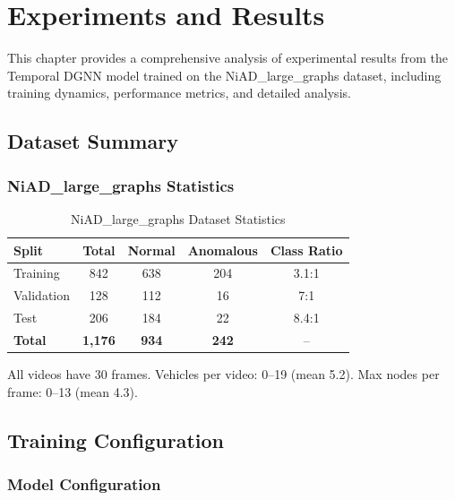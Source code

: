 
\chapter{Experiments and Results}
\label{ch:experiments}

This chapter provides a comprehensive analysis of experimental results from the Temporal DGNN model trained on the NiAD\_large\_graphs dataset, including training dynamics, performance metrics, and detailed analysis.

\section{Dataset Summary}

\subsection{NiAD\_large\_graphs Statistics}

\begin{table}[H]
\centering
\caption{NiAD\_large\_graphs Dataset Statistics}
\label{tab:dataset_stats_exp}
\begin{tabular}{lcccc}
\toprule
\textbf{Split} & \textbf{Total} & \textbf{Normal} & \textbf{Anomalous} & \textbf{Class Ratio} \\
\midrule
Training & 842 & 638 & 204 & 3.1:1 \\
Validation & 128 & 112 & 16 & 7:1 \\
Test & 206 & 184 & 22 & 8.4:1 \\
\midrule
\textbf{Total} & \textbf{1,176} & \textbf{934} & \textbf{242} & -- \\
\bottomrule
\end{tabular}
\end{table}

All videos have 30 frames. Vehicles per video: 0--19 (mean 5.2). Max nodes per frame: 0--13 (mean 4.3).

\section{Training Configuration}

\subsection{Model Configuration}

